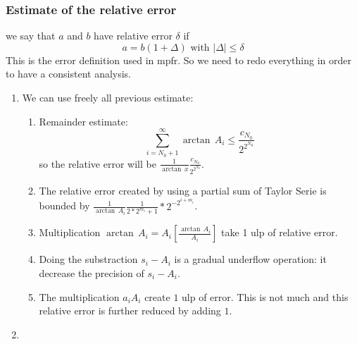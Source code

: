 \documentclass[12pt]{amsart}
\begin{document}
\subsubsection{Estimate of the relative error}
\noindent we say that $a$ and $b$ have relative error $\delta$ if
\begin{equation*}
a=b(1+\Delta)\mbox{~with~}|\Delta|\leq \delta
\end{equation*}
This is the error definition used in mpfr. So we need to redo everything in order to have a consistent analysis.
\begin{enumerate}
\item We can use freely all previous estimate:
\begin{enumerate}
\item Remainder estimate:
\begin{equation*}
\sum_{i=N_0+1}^{\infty}\arctan\,A_i\leq \frac{c_{N_0}}{2^{2^{N_0}}}
\end{equation*}
so the relative error will be $\frac{1}{\arctan\,x}\frac{c_{N_0}}{2^{2^{N_0}}}$.
\item The relative error created by using a partial sum of Taylor Serie is bounded by $\frac{1}{\arctan\,A_i}\frac{1}{2*2^{m_i}+1}*2^{-2^{i+m_i}}$.
\item Multiplication $\arctan\,A_i=A_i[\frac{\arctan\,A_i}{A_i}]$ take 1 ulp of relative error.
\item Doing the substraction $s_i-A_i$ is a gradual underflow operation: it decrease the precision of $s_i-A_i$.
\item The multiplication $a_iA_i$ create $1$ ulp of error. This is not much and this relative error is further reduced by adding $1$.
\end{enumerate}
\item 

\end{enumerate}
\end{document}
